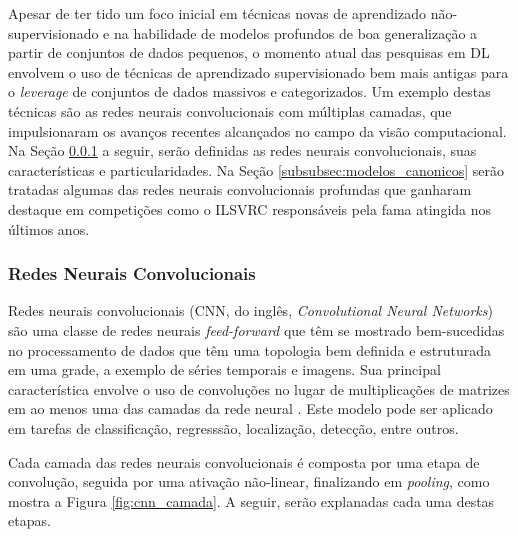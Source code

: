 Apesar de ter tido um foco inicial em técnicas novas de aprendizado não-supervisionado e na habilidade de modelos profundos de boa generalização a partir de conjuntos de dados pequenos, o momento atual das pesquisas em DL envolvem o uso de técnicas de aprendizado supervisionado bem mais antigas para o \emph{leverage} de conjuntos de dados massivos e categorizados. Um exemplo destas técnicas são as redes neurais convolucionais com múltiplas camadas, que impulsionaram os avanços recentes alcançados no campo da visão computacional. Na Seção \ref{subsubsec:rnc} a seguir, serão definidas as redes neurais convolucionais, suas características e particularidades. Na Seção \ref{subsubsec:modelos_canonicos} serão tratadas algumas das redes neurais convolucionais profundas que ganharam destaque em competições como o ILSVRC responsáveis pela fama atingida nos últimos anos.


\subsubsection{Redes Neurais Convolucionais} \label{subsubsec:rnc}
Redes neurais convolucionais (CNN, do inglês, \emph{Convolutional Neural Networks}) são uma classe de redes neurais \emph{feed-forward} que têm se mostrado bem-sucedidas no processamento de dados que têm uma topologia bem definida e estruturada em uma grade, a exemplo de séries temporais e imagens. Sua principal característica envolve o uso de convoluções no lugar de multiplicações de matrizes em ao menos uma das camadas da rede neural \cite{goodfellow2016deep}. Este modelo pode ser aplicado em tarefas de classificação, regresssão, localização, detecção, entre outros.

Cada camada das redes neurais convolucionais é composta por uma etapa de convolução, seguida por uma ativação não-linear, finalizando em \emph{pooling}, como mostra a Figura \ref{fig:cnn_camada}. A seguir, serão explanadas cada uma destas etapas.

